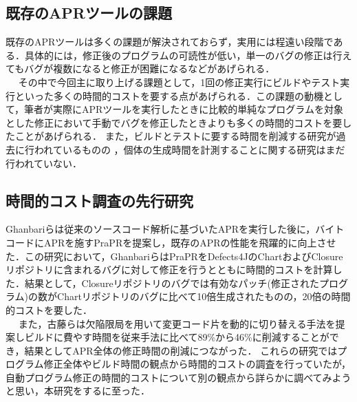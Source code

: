 \documentclass[uplatex,dvipdfmx,a4paper]{jsarticle}
\let\oldcite\cite
\renewcommand{\cite}[1]{\xspace\oldcite{#1}}
\begin{document}
\subsection{既存のAPRツールの課題} \label{sec:prev_challenge}
既存のAPRツールは多くの課題が解決されておらず\cite{le2013current}，実用には程遠い段階である．具体的には，修正後のプログラムの可読性が低い\cite{smith2015cure}，単一のバグの修正は行えてもバグが複数になると修正が困難になる\cite{saha2019harnessing}などがあげられる．\\　
その中で今回主に取り上げる課題として，1回の修正実行にビルドやテスト実行といった多くの時間的コストを要する点\cite{chen2017contract}があげられる．この課題の動機として，筆者が実際にAPRツールを実行したときに比較的単純なプログラムを対象とした修正において手動でバグを修正したときよりも多くの時間的コストを要したことがあげられる．
また，ビルドとテストに要する時間を削減する研究が過去に行われているものの\cite{id692}
，個体の生成時間を計測することに関する研究はまだ行われていない．
\subsection{時間的コスト調査の先行研究}
Ghanbari\cite{ghanbari2019practical}らは従来のソースコード解析に基づいたAPRを実行した後に，バイトコードにAPRを施すPraPRを提案し，既存のAPRの性能を飛躍的に向上させた．この研究において，GhanbariらはPraPRをDefects4JのChartおよびClosureリポジトリに含まれるバグに対して修正を行うとともに時間的コストを計算した．結果として，Closureリポジトリのバグでは有効なパッチ(修正されたプログラム)の数がChartリポジトリのバグに比べて10倍生成されたものの，20倍の時間的コストを要した．\\　
また，古藤\cite{id692}らは欠陥限局を用いて変更コード片を動的に切り替える手法を提案しビルドに費やす時間を従来手法に比べて89\%から46\%に削減することができ，結果としてAPR全体の修正時間の削減につながった．
これらの研究ではプログラム修正全体やビルド時間の観点から時間的コストの調査を行っていたが，自動プログラム修正の時間的コストについて別の観点から詳らかに調べてみようと思い，本研究をするに至った．
\clearpage
\end{document}
